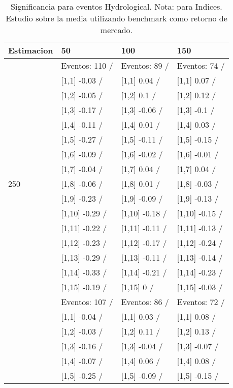 \begin{table}

\caption{Significancia para eventos Hydrological. Nota: para Indices. Estudio sobre la media utilizando benchmark como retorno de mercado.}
\centering
\begin{tabular}[t]{llll}
\toprule
Estimacion & 50 & 100 & 150\\
\midrule
 & Eventos:  110 / & Eventos:  89 / & Eventos:  74 /\\
 & {}[1,1] -0.03  / & {}[1,1] 0.04  / & {}[1,1] 0.07  /\\
 & {}[1,2] -0.05  / & {}[1,2] 0.1  / & {}[1,2] 0.12  /\\
 & {}[1,3] -0.17  / & {}[1,3] -0.06  / & {}[1,3] -0.1  /\\
 & {}[1,4] -0.11  / & {}[1,4] 0.01  / & {}[1,4] 0.03  /\\
\addlinespace
 & {}[1,5] -0.27  / & {}[1,5] -0.11  / & {}[1,5] -0.15  /\\
 & {}[1,6] -0.09  / & {}[1,6] -0.02  / & {}[1,6] -0.01  /\\
 & {}[1,7] -0.04  / & {}[1,7] 0.04  / & {}[1,7] 0.04  /\\
250 & {}[1,8] -0.06  / & {}[1,8] 0.01  / & {}[1,8] -0.03  /\\
 & {}[1,9] -0.23  / & {}[1,9] -0.09  / & {}[1,9] -0.13  /\\
\addlinespace
 & {}[1,10] -0.29  / & {}[1,10] -0.18  / & {}[1,10] -0.15  /\\
 & {}[1,11] -0.22  / & {}[1,11] -0.11  / & {}[1,11] -0.13  /\\
 & {}[1,12] -0.23  / & {}[1,12] -0.17  / & {}[1,12] -0.24  /\\
 & {}[1,13] -0.29  / & {}[1,13] -0.11  / & {}[1,13] -0.14  /\\
 & {}[1,14] -0.33  / & {}[1,14] -0.21  / & {}[1,14] -0.23  /\\
\addlinespace
 & {}[1,15] -0.19  / & {}[1,15] 0  / & {}[1,15] -0.03  /\\
 & Eventos:  107 / & Eventos:  86 / & Eventos:  72 /\\
 & {}[1,1] -0.04  / & {}[1,1] 0.03  / & {}[1,1] 0.08  /\\
 & {}[1,2] -0.03  / & {}[1,2] 0.11  / & {}[1,2] 0.13  /\\
 & {}[1,3] -0.16  / & {}[1,3] -0.04  / & {}[1,3] -0.07  /\\
\addlinespace
 & {}[1,4] -0.07  / & {}[1,4] 0.06  / & {}[1,4] 0.08  /\\
 & {}[1,5] -0.25  / & {}[1,5] -0.09  / & {}[1,5] -0.15  /\\

\end{tabular}
\end{table}
